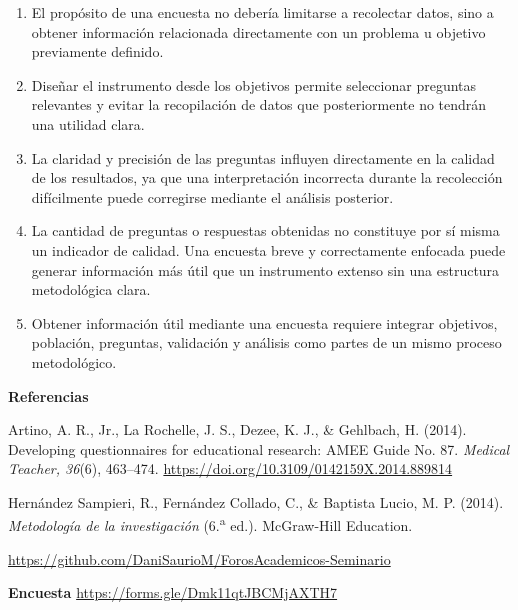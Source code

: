 \documentclass[12pt,letterpaper]{article}
\begin{document}
\begin{enumerate}[leftmargin=*, itemsep=2pt]

    \item El propósito de una encuesta no debería limitarse a recolectar datos, sino a obtener información relacionada directamente con un problema u objetivo previamente definido.

    \item Diseñar el instrumento desde los objetivos permite seleccionar preguntas relevantes y evitar la recopilación de datos que posteriormente no tendrán una utilidad clara.

    \item La claridad y precisión de las preguntas influyen directamente en la calidad de los resultados, ya que una interpretación incorrecta durante la recolección difícilmente puede corregirse mediante el análisis posterior.

    \item La cantidad de preguntas o respuestas obtenidas no constituye por sí misma un indicador de calidad. Una encuesta breve y correctamente enfocada puede generar información más útil que un instrumento extenso sin una estructura metodológica clara.

    \item Obtener información útil mediante una encuesta requiere integrar objetivos, población, preguntas, validación y análisis como partes de un mismo proceso metodológico.

\end{enumerate}


\textbf{Referencias}

Artino, A. R., Jr., La Rochelle, J. S., Dezee, K. J., \& Gehlbach, H. (2014).
Developing questionnaires for educational research: AMEE Guide No. 87.
\textit{Medical Teacher, 36}(6), 463--474.
\url{https://doi.org/10.3109/0142159X.2014.889814}

Hernández Sampieri, R., Fernández Collado, C., \& Baptista Lucio, M. P. (2014).
\textit{Metodología de la investigación} (6.\textsuperscript{a} ed.).
McGraw-Hill Education.

\noindent\url{https://github.com/DaniSaurioM/ForosAcademicos-Seminario}

\textbf {Encuesta}
\noindent\url{https://forms.gle/Dmk11qtJBCMjAXTH7}
\end{document}
